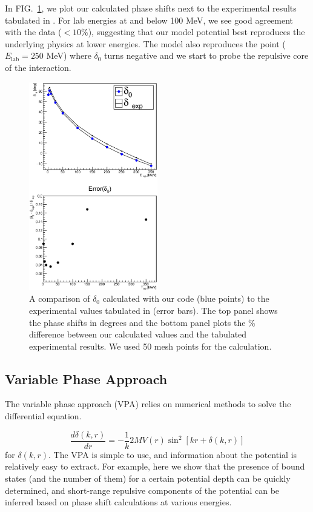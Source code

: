 \documentclass[10pt,showpacs,preprintnumbers,footinbib,amsmath,amssymb,aps,prl,twocolumn,groupedaddress,superscriptaddress,showkeys]{revtex4-1}
\begin{document}
In FIG.~\ref{fig:NPexp}, we plot our calculated phase shifts next to the experimental results
tabulated in \citep{Nijmegen}. For lab energies at and below 100 MeV, we see good agreement
with the data ($< 10$\%), suggesting that our model potential best reproduces the underlying
physics at lower energies. The model also reproduces the point ($E_{\mathrm{lab}} = 250$ MeV)
where $\delta_0$ turns negative and we start to probe the repulsive core of the interaction.

\begin{figure}[H]
\centering
	\includegraphics[width=0.5\textwidth]{figures/phy989_NPexp.eps}
	\caption{A comparison of $\delta _0$ calculated with our code
	(blue points) to the experimental values tabulated in \citep{Nijmegen} (error
	bars). The top panel shows the phase shifts in degrees and the bottom panel
	plots the \% difference between our calculated values and the tabulated
	experimental results. We used 50 mesh points for the calculation.}
	\label{fig:NPexp}
\end{figure}


\subsection{Variable Phase Approach}
The variable phase approach (VPA) relies on numerical methods to solve the differential equation.

\[
\frac{d\delta(k,r)}{dr} = -\frac{1}{k} 2M V(r) \sin^2[kr + \delta(k,r)]
\]
for $\delta(k,r)$. The VPA is simple to use,
and information about the potential is relatively easy to extract. For example, here we show
that the presence of bound states (and the number of them) for a certain potential depth can
be quickly determined, and short-range repulsive components of the potential can
be inferred based on phase shift calculations at various energies.
\end{document}
